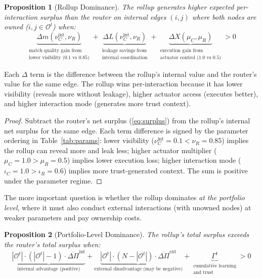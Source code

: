 \documentclass[12pt]{article}
\newtheorem{proposition}{Proposition}
\theoremstyle{definition}
\begin{document}
\begin{proposition}[Rollup Dominance]
\label{prop:dominance}
The rollup generates higher expected per-interaction surplus than the router on internal edges $(i,j)$ where both nodes are owned ($i,j \in \mathcal{O}^t$) when:
\begin{equation}
\underbrace{\Delta m(\nu_C^{\text{int}}, \nu_R)}_{\substack{\text{match quality gain from} \\ \text{lower visibility (0.1 vs 0.85)}}} + \underbrace{\Delta L(\nu_C^{\text{int}}, \nu_R)}_{\substack{\text{leakage savings from} \\ \text{internal coordination}}} + \underbrace{\Delta X(\mu_C, \mu_R)}_{\substack{\text{execution gain from} \\ \text{actuator control (1.0 vs 0.5)}}} > 0
\end{equation}
\end{proposition}

\noindent Each $\Delta$ term is the difference between the rollup's internal value and the router's value for the same edge. The rollup wins per-interaction because it has lower visibility (reveals more without leakage), higher actuator access (executes better), and higher interaction mode (generates more trust context).

\begin{proof}
Subtract the router's net surplus (\ref{eq:surplus}) from the rollup's internal net surplus for the same edge. Each term difference is signed by the parameter ordering in Table~\ref{tab:params}: lower visibility ($\nu_C^{\text{int}} = 0.1 < \nu_R = 0.85$) implies the rollup can reveal more and leak less; higher actuator multiplier ($\mu_C = 1.0 > \mu_R = 0.5$) implies lower execution loss; higher interaction mode ($\iota_C = 1.0 > \iota_R = 0.6$) implies more trust-generated context. The sum is positive under the parameter regime.
\end{proof}

The more important question is whether the rollup dominates \textit{at the portfolio level}, where it must also conduct external interactions (with unowned nodes) at weaker parameters and pay ownership costs.

\begin{proposition}[Portfolio-Level Dominance]
\label{prop:portfolio}
The rollup's total surplus exceeds the router's total surplus when:
\begin{equation}
\underbrace{|\mathcal{O}^t| \cdot (|\mathcal{O}^t| - 1) \cdot \overline{\Delta\Pi}^{\text{int}}}_{\text{internal advantage (positive)}} + \underbrace{|\mathcal{O}^t| \cdot (N - |\mathcal{O}^t|) \cdot \overline{\Delta\Pi}^{\text{ext}}}_{\text{external disadvantage (may be negative)}} + \underbrace{\Gamma^t}_{\substack{\text{cumulative learning} \\ \text{and trust}}} > 0
\end{equation}
\end{proposition}
\end{document}
